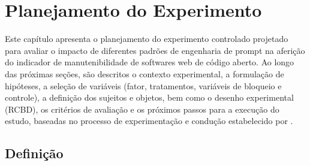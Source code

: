 \chapter[Planejamento do Experimento]{Planejamento do Experimento}
\label{cap:planejamento}

Este capítulo apresenta o planejamento do experimento controlado projetado para avaliar o impacto de diferentes padrões de engenharia de prompt na aferição do indicador de manutenibilidade de softwares web de código aberto. Ao longo das próximas seções, são descritos o contexto experimental, a formulação de hipóteses, a seleção de variáveis (fator, tratamentos, variáveis de bloqueio e controle), a definição dos sujeitos e objetos, bem como o desenho experimental (RCBD), os critérios de avaliação e os próximos passos para a execução do estudo, baseadas no processo de experimentação e condução estabelecido por .

\section{Definição}




